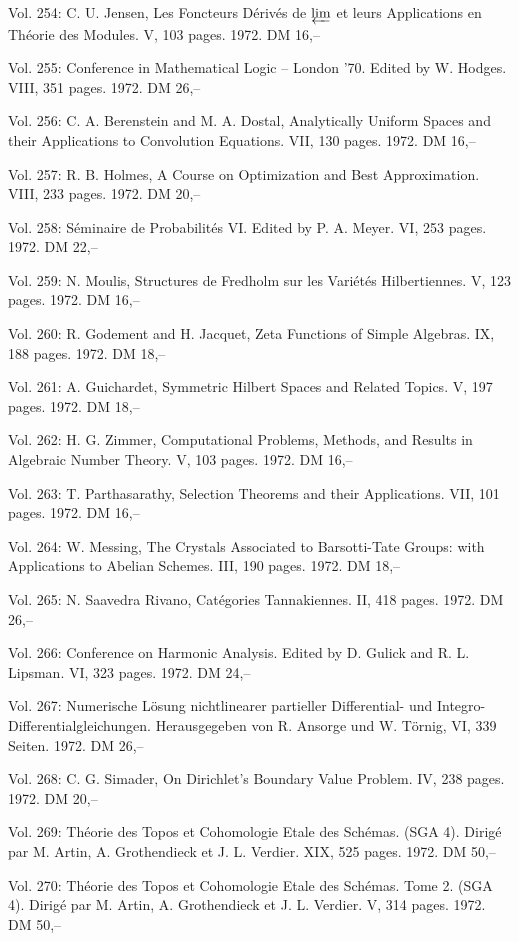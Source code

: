 Vol. 254: C. U. Jensen, Les Foncteurs Dérivés de $\varprojlim$ et leurs Applications en Théorie des Modules. V, 103 pages. 1972. DM 16,--

Vol. 255: Conference in Mathematical Logic -- London '70. Edited by W. Hodges. VIII, 351 pages. 1972. DM 26,--

Vol. 256: C. A. Berenstein and M. A. Dostal, Analytically Uniform Spaces and their Applications to Convolution Equations. VII, 130 pages. 1972. DM 16,--

Vol. 257: R. B. Holmes, A Course on Optimization and Best Approximation. VIII, 233 pages. 1972. DM 20,--

Vol. 258: Séminaire de Probabilités VI. Edited by P. A. Meyer. VI, 253 pages. 1972. DM 22,--

Vol. 259: N. Moulis, Structures de Fredholm sur les Variétés Hilbertiennes. V, 123 pages. 1972. DM 16,--

Vol. 260: R. Godement and H. Jacquet, Zeta Functions of Simple Algebras. IX, 188 pages. 1972. DM 18,--

Vol. 261: A. Guichardet, Symmetric Hilbert Spaces and Related Topics. V, 197 pages. 1972. DM 18,--

Vol. 262: H. G. Zimmer, Computational Problems, Methods, and Results in Algebraic Number Theory. V, 103 pages. 1972. DM 16,--

Vol. 263: T. Parthasarathy, Selection Theorems and their Applications. VII, 101 pages. 1972. DM 16,--

Vol. 264: W. Messing, The Crystals Associated to Barsotti-Tate Groups: with Applications to Abelian Schemes. III, 190 pages. 1972. DM 18,--

Vol. 265: N. Saavedra Rivano, Catégories Tannakiennes. II, 418 pages. 1972. DM 26,--

Vol. 266: Conference on Harmonic Analysis. Edited by D. Gulick and R. L. Lipsman. VI, 323 pages. 1972. DM 24,--

Vol. 267: Numerische Lösung nichtlinearer partieller Differential- und Integro-Differentialgleichungen. Herausgegeben von R. Ansorge und W. Törnig, VI, 339 Seiten. 1972. DM 26,--

Vol. 268: C. G. Simader, On Dirichlet's Boundary Value Problem. IV, 238 pages. 1972. DM 20,--

Vol. 269: Théorie des Topos et Cohomologie Etale des Schémas. (SGA 4). Dirigé par M. Artin, A. Grothendieck et J. L. Verdier. XIX, 525 pages. 1972. DM 50,--

Vol. 270: Théorie des Topos et Cohomologie Etale des Schémas. Tome 2. (SGA 4). Dirigé par M. Artin, A. Grothendieck et J. L. Verdier. V, 314 pages. 1972. DM 50,--

